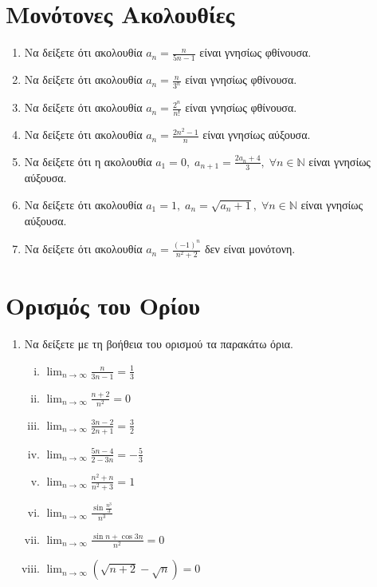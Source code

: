 \section{Μονότονες Ακολουθίες}

\begin{enumerate}
  \item Να δείξετε ότι ακολουθία $ a_{n} = \frac{n}{5n-1} $ είναι 
    γνησίως φθίνουσα.
  \item Να δείξετε ότι ακολουθία $ a_{n} = \frac{n}{3^{n}} $ είναι 
    γνησίως φθίνουσα.
  \item Να δείξετε ότι ακολουθία $ a_{n} = \frac{2^{n}}{n!} $ είναι 
    γνησίως φθίνουσα.
  \item Να δείξετε ότι ακολουθία $ a_{n} = \frac{2n^{2}-1}{n} $ είναι γνησίως 
    αύξουσα.
  \item Να δείξετε ότι η ακολουθία $ a_{1}=0, \; a_{n+1}= 
    \frac{2 a_{n}+4}{3}, \; \forall n \in \mathbb{N} $ είναι γνησίως αύξουσα.
  \item Να δείξετε ότι ακολουθία $ a_{1}=1, \; a_{n} = \sqrt{a_{n}+1}, \; 
    \forall n \in \mathbb{N}$ είναι γνησίως αύξουσα.
  \item Να δείξετε ότι ακολουθία $ a_{n} =  \frac{(-1)^{n}}{n^{2}+2} $ 
    δεν είναι μονότονη.
\end{enumerate}

\section{Ορισμός του Ορίου}

\begin{enumerate}
  \item Να δείξετε με τη βοήθεια του ορισμού τα παρακάτω όρια.
    \begin{enumerate}[i)]
      \item $ \lim_{n \to \infty} \frac{n}{3n-1} = \frac{1}{3} $
      \item $ \lim_{n \to \infty} \frac{n+2}{n^{2}} = 0 $
      \item $ \lim_{n \to \infty} \frac{3n -2}{2n+1} = \frac{3}{2} $ 
      \item $ \lim_{n \to \infty} \frac{5n-4}{2-3n} = - \frac{5}{3} $ 
      \item $ \lim_{n \to \infty} \frac{n^{2}+n}{n^{2}+3} = 1 $ 
      \item $ \lim_{n \to \infty} \frac{\sin{\frac{n^{3}}{3}}}{n^{3}} $
      \item $ \lim_{n \to \infty} \frac{\sin{n} + \cos{3n}}{n^{2}} = 0 $
      \item $ \lim_{n \to \infty} (\sqrt{n+2} - \sqrt{n}) = 0 $
    \end{enumerate}
\end{enumerate}




